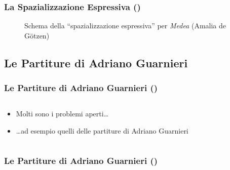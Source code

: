 \documentclass[compress]{beamer}
\newcommand{\oggplay}[2]{\href{run: ogg123 -d esd \exampledir/#1}{#2 \pgfuseimage{speaker}}}
\begin{document}
\begin{frame}
    \frametitle{La Spazializzazione Espressiva ()}

    \begin{center}
        \begin{figure}
            \begin{center}
            \end{center}
            \caption{Schema della ``spazializzazione espressiva'' per \emph{Medea} (Amalia de G\"otzen)}
            \label{fig:medea processing}
        \end{figure}
    \end{center}
    
\end{frame}

\subsection[Guarnieri]{Le Partiture di Adriano Guarnieri}

\setcounter{ms}{0}

\begin{frame}
    \frametitle<+- | alert@+->{Le Partiture di Adriano Guarnieri ()}

    \begin{columns}[T]
        \begin{column}{0.7\textwidth}
				    \begin{itemize}[<+- | alert@+->]
				       \item Molti sono i problemi aperti\dots
				       \item \dots ad esempio quelli delle partiture di Adriano
				                    Guarnieri
				    \end{itemize}
        \end{column}
        \begin{column}{0.3\textwidth}
        \end{column}
    \end{columns}
    
\end{frame}

\begin{frame}
    \frametitle{Le Partiture di Adriano Guarnieri ()}

    \begin{columns}[T]
        \begin{column}{0.8\textwidth}
            \href{run: display \imagedir/Guarnieri-Passione-Lettera_M}
                {}
        \end{column}
        \begin{column}{0.1\textwidth}
            \oggplay{Guarnieri-Passione_Lettera_M.ogg}{}
        \end{column}
    \end{columns}

\end{frame}
\end{document}
